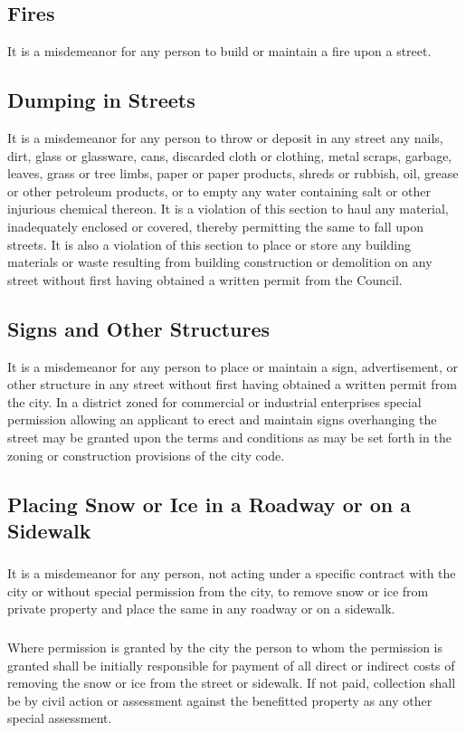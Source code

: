 \subsection{Fires}
It is a misdemeanor for any person to build or maintain a fire upon a street.
\subsection{Dumping in Streets}
It is a misdemeanor for any person to throw or deposit in any street any nails, dirt, glass or glassware, cans, discarded cloth or clothing, metal scraps, garbage, leaves, grass or tree limbs, paper or paper products, shreds or rubbish, oil, grease or other petroleum products, or to empty any water containing salt or other injurious chemical thereon.  It is a violation of this section to haul any material, inadequately enclosed or covered, thereby permitting the same to fall upon streets.  It is also a violation of this section to place or store any building materials or waste resulting from building construction or demolition on any street without first having obtained a written permit from the Council.
\subsection{Signs and Other Structures}
It is a misdemeanor for any person to place or maintain a sign, advertisement, or other structure in any street without first having obtained a written permit from the city.  In a district zoned for commercial or industrial enterprises special permission allowing an applicant to erect and maintain signs overhanging the street may be granted upon the terms and conditions as may be set forth in the zoning or construction provisions of the city code.
\subsection{Placing Snow or Ice in a Roadway or on a Sidewalk}
\subsubsection{}
It is a misdemeanor for any person, not acting under a specific contract with the city or without special permission from the city, to remove snow or ice from private property and place the same in any roadway or on a sidewalk.
\subsubsection{}
Where permission is granted by the city the person to whom the permission is granted shall be initially responsible for payment of all direct or indirect costs of removing the snow or ice from the street or sidewalk.  If not paid, collection shall be by civil action or assessment against the benefitted property as any other special assessment.
